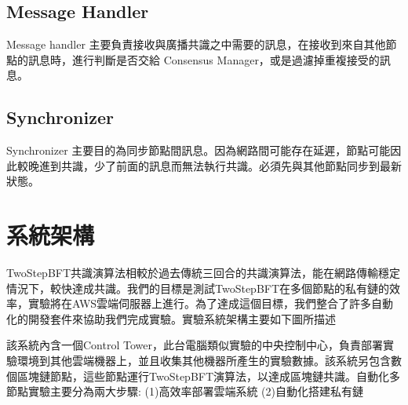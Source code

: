\subsection{Message Handler}\label{se_5} 
Message handler 主要負責接收與廣播共識之中需要的訊息，在接收到來自其他節點的訊息時，進行判斷是否交給 Consensus Manager，或是過濾掉重複接受的訊息。

\subsection{Synchronizer}\label{se_5}
Synchronizer 主要目的為同步節點間訊息。因為網路間可能存在延遲，節點可能因此較晚進到共識，少了前面的訊息而無法執行共識。必須先與其他節點同步到最新狀態。  




\section{系統架構}\label{se_5}  
TwoStepBFT共識演算法相較於過去傳統三回合的共識演算法，能在網路傳輸穩定情況下，較快達成共識。我們的目標是測試TwoStepBFT在多個節點的私有鏈的效率，實驗將在AWS雲端伺服器上進行。為了達成這個目標，我們整合了許多自動化的開發套件來協助我們完成實驗。實驗系統架構主要如下圖所描述 



該系統內含一個Control Tower，此台電腦類似實驗的中央控制中心，負責部署實驗環境到其他雲端機器上，並且收集其他機器所產生的實驗數據。該系統另包含數個區塊鏈節點，這些節點運行TwoStepBFT演算法，以達成區塊鏈共識。自動化多節點實驗主要分為兩大步驟: (1)高效率部署雲端系統 (2)自動化搭建私有鏈

